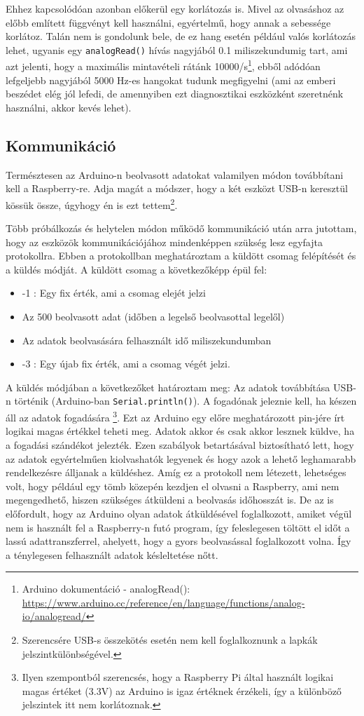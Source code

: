 \documentclass[12pt,a4paper]{article}
\begin{document}
      Ehhez kapcsolódóan azonban előkerül egy korlátozás is. Mivel az olvasáshoz az előbb említett függvényt kell használni, egyértelmű, hogy annak a sebessége korlátoz. Talán nem is gondolunk bele, de ez hang esetén például valós korlátozás lehet, ugyanis egy \texttt{analogRead()} hívás nagyjából 0.1 miliszekundumig tart, ami azt jelenti, hogy a maximális mintavételi rátánk 10000/s\footnote{Arduino dokumentáció - analogRead(): \url{https://www.arduino.cc/reference/en/language/functions/analog-io/analogread/}}, ebből adódóan lefgeljebb nagyjából 5000 Hz-es hangokat tudunk megfigyelni (ami az emberi beszédet elég jól lefedi, de amennyiben ezt diagnosztikai eszközként szeretnénk használni, akkor kevés lehet).

    \subsection{Kommunikáció}
      Természtesen az Arduino-n beolvasott adatokat valamilyen módon továbbítani kell a Raspberry-re. Adja magát a módszer, hogy a két eszközt USB-n keresztül kössük össze, úgyhogy én is ezt tettem\footnote{Szerencsére USB-s összekötés esetén nem kell foglalkoznunk a lapkák jelszintkülönbségével.}.

      Több próbálkozás és helytelen módon működő kommunikáció után arra jutottam, hogy az eszközök kommunikációjához mindenképpen szükség lesz egyfajta protokollra. Ebben a protokollban meghatároztam a küldött csomag felépítését és a küldés módját. A küldött csomag a következőképp épül fel:
      \begin{itemize}
        \item -1 : Egy fix érték, ami a csomag elejét jelzi
        \item Az 500 beolvasott adat (időben a legelső beolvasottal legelől)
        \item Az adatok beolvasására felhasznált idő miliszekundumban
        \item -3 : Egy újab fix érték, ami a csomag végét jelzi.
      \end{itemize}
      A küldés módjában a következőket határoztam meg: Az adatok továbbítása USB-n történik (Arduino-ban \texttt{Serial.println()}). A fogadónak jeleznie kell, ha készen áll az adatok fogadására \footnote{Ilyen szempontból szerencsés, hogy a Raspberry Pi által használt logikai magas értéket (3.3V) az Arduino is igaz értéknek érzékeli, így a különböző jelszintek itt nem korlátoznak.}. Ezt az Arduino egy előre meghatározott pin-jére írt logikai magas értékkel teheti meg. Adatok akkor és csak akkor lesznek küldve, ha a fogadási szándékot jelezték.
      Ezen szabályok betartásával biztosítható lett, hogy az adatok egyértelműen kiolvashatók legyenek és hogy azok a lehető leghamarabb rendelkezésre álljanak a küldéshez. Amíg ez a protokoll nem létezett, lehetséges volt, hogy például egy tömb közepén kezdjen el olvasni a Raspberry, ami nem megengedhető, hiszen szükséges átküldeni a beolvasás időhosszát is. De az is előfordult, hogy az Arduino olyan adatok átküldésével foglalkozott, amiket végül nem is használt fel a Raspberry-n futó program, így feleslegesen töltött el időt a lassú adattranszferrel, ahelyett, hogy a gyors beolvasással foglalkozott volna. Így a ténylegesen felhasznált adatok késleltetése nőtt.
\end{document}
